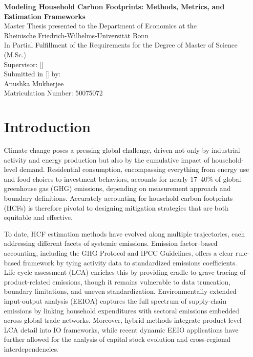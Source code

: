 \documentclass[12pt,a4paper]{article}%
\begin{document}
\begin{titlepage}
  \centering
  \vspace*{5cm}
  {\Huge \textbf{Modeling Household Carbon Footprints: Methods, Metrics, and Estimation Frameworks}}\\[2cm]
  {\large Master Thesis presented to the Department of Economics at the}\\
  {\large Rheinische Friedrich-Wilhelms-Universität Bonn}\\[1cm]
  {\large In Partial Fulfillment of the Requirements for the Degree of Master of Science (M.Sc.)}\\[2cm]
  Supervisor: [] \\[0.5cm]
  Submitted in [] by: \\[0.2cm]
  Anushka Mukherjee \\[0.2cm]
  Matriculation Number: 50075072
  \vfill
\end{titlepage}

\tableofcontents
\thispagestyle{empty}
\newpage

\setcounter{page}{1}


\section{Introduction}
Climate change poses a pressing global challenge, driven not only by industrial activity and energy production but also by the cumulative impact of household-level demand. Residential consumption, encompassing everything from energy use and food choices to investment behaviors, accounts for nearly 17–40\% of global greenhouse gas (GHG) emissions, depending on measurement approach and boundary definitions. Accurately accounting for household carbon footprints (HCFs) is therefore pivotal to designing mitigation strategies that are both equitable and effective.

To date, HCF estimation methods have evolved along multiple trajectories, each addressing different facets of systemic emissions. Emission factor–based accounting, including the GHG Protocol and IPCC Guidelines, offers a clear rule-based framework by tying activity data to standardized emissions coefficients. Life cycle assessment (LCA) enriches this by providing cradle-to-grave tracing of product-related emissions, though it remains vulnerable to data truncation, boundary limitations, and uneven standardization. Environmentally extended input-output analysis (EEIOA) captures the full spectrum of supply-chain emissions by linking household expenditures with sectoral emissions embedded across global trade networks. Moreover, hybrid methods integrate product-level LCA detail into IO frameworks, while recent dynamic EEIO applications have further allowed for the analysis of capital stock evolution and cross-regional interdependencies.
\end{document}
